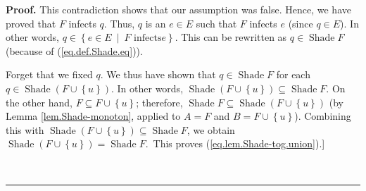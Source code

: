 \documentclass[numbers=enddot,12pt,final,onecolumn]{scrartcl}%
\theoremstyle{definition}
\newenvironment{proof}[1][Proof]{\noindent\textbf{#1.} }{\ \rule{0.5em}{0.5em}}
\newenvironment{verlong}{}{}
\newenvironment{vershort}{}{}
\begin{document}
\begin{proof}
\begin{verlong}
This contradiction shows that our assumption was false. Hence, we have proved
that $F$ infects $q$. Thus, $q$ is an $e\in E$ such that $F$ infects $e$
(since $q\in E$). In other words, $q\in\left\{  e\in E\ \mid\ F\text{ infects
}e\right\}  $. This can be rewritten as $q\in\operatorname*{Shade}F$ (because
of (\ref{eq.def.Shade.eq})).

Forget that we fixed $q$. We thus have shown that $q\in\operatorname*{Shade}F$
for each $q\in\operatorname*{Shade}\left(  F\cup\left\{  u\right\}  \right)
$. In other words, $\operatorname*{Shade}\left(  F\cup\left\{  u\right\}
\right)  \subseteq\operatorname*{Shade}F$. On the other hand, $F\subseteq
F\cup\left\{  u\right\}  $; therefore, $\operatorname*{Shade}F\subseteq
\operatorname*{Shade}\left(  F\cup\left\{  u\right\}  \right)  $ (by Lemma
\ref{lem.Shade-monoton}, applied to $A=F$ and $B=F\cup\left\{  u\right\}  $).
Combining this with $\operatorname*{Shade}\left(  F\cup\left\{  u\right\}
\right)  \subseteq\operatorname*{Shade}F$, we obtain $\operatorname*{Shade}%
\left(  F\cup\left\{  u\right\}  \right)  =\operatorname*{Shade}F$.\ This
proves (\ref{eq.lem.Shade-tog.union}).]
\end{verlong}

\begin{vershort}
[\textit{Proof of (\ref{eq.lem.Shade-tog.diff}):} We must prove that
$\operatorname*{Shade}\left(  F\setminus\left\{  u\right\}  \right)
=\operatorname*{Shade}F$. This is obvious if $F\setminus\left\{  u\right\}
=F$. Thus, for the rest of this proof, we WLOG assume that $F\setminus\left\{
u\right\}  \neq F$. Hence, $u\in F$ and thus $\left(  F\setminus\left\{
u\right\}  \right)  \cup\left\{  u\right\}  =F$.

We have $F\setminus\left\{  u\right\}  \subseteq F$ and thus
$\operatorname*{Shade}\left(  F\setminus\left\{  u\right\}  \right)
\subseteq\operatorname*{Shade}F$ (by Lemma \ref{lem.Shade-monoton}). Hence,
from $u\notin\operatorname*{Shade}F$, we obtain $u\notin\operatorname*{Shade}%
\left(  F\setminus\left\{  u\right\}  \right)  $. Therefore,
(\ref{eq.lem.Shade-tog.union}) (applied to $F\setminus\left\{  u\right\}  $
instead of $F$) yields $\operatorname*{Shade}\left(  \left(  F\setminus
\left\{  u\right\}  \right)  \cup\left\{  u\right\}  \right)
=\operatorname*{Shade}\left(  F\setminus\left\{  u\right\}  \right)  $. Thus,
$\operatorname*{Shade}\left(  F\setminus\left\{  u\right\}  \right)
=\operatorname*{Shade}\underbrace{\left(  \left(  F\setminus\left\{
u\right\}  \right)  \cup\left\{  u\right\}  \right)  }_{=F}%
=\operatorname*{Shade}F$. This proves (\ref{eq.lem.Shade-tog.diff}).]
\end{vershort}


\end{proof}
\end{document}
